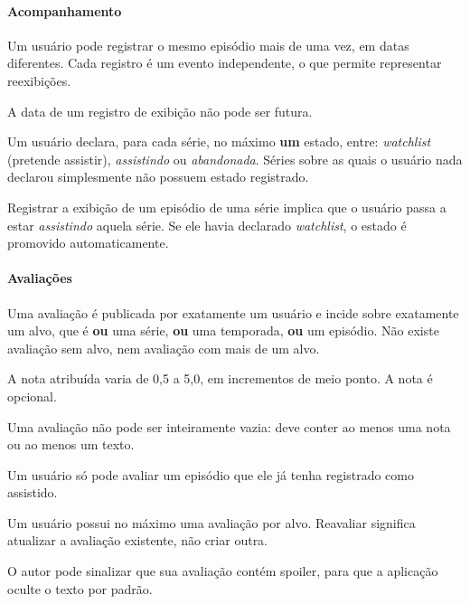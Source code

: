 \documentclass[a4paper,12pt,oneside,openany]{book}
\begin{document}
\paragraph{Acompanhamento}
\begin{description}[leftmargin=2.2cm,style=nextline,font=\normalfont\bfseries]
    \item[RN11] Um usuário pode registrar o mesmo episódio mais de uma vez, em
    datas diferentes. Cada registro é um evento independente, o que permite
    representar reexibições.
    \item[RN12] A data de um registro de exibição não pode ser futura.
    \item[RN13] Um usuário declara, para cada série, no máximo \textbf{um} estado,
    entre: \textit{watchlist} (pretende assistir), \textit{assistindo} ou
    \textit{abandonada}. Séries sobre as quais o usuário nada declarou simplesmente
    não possuem estado registrado.
    \item[RN14] Registrar a exibição de um episódio de uma série implica que o
    usuário passa a estar \textit{assistindo} aquela série. Se ele havia declarado
    \textit{watchlist}, o estado é promovido automaticamente.
\end{description}

\paragraph{Avaliações}
\begin{description}[leftmargin=2.2cm,style=nextline,font=\normalfont\bfseries]
    \item[RN15] Uma avaliação é publicada por exatamente um usuário e incide sobre
    exatamente um alvo, que é \textbf{ou} uma série, \textbf{ou} uma temporada,
    \textbf{ou} um episódio. Não existe avaliação sem alvo, nem avaliação com mais
    de um alvo.
    \item[RN16] A nota atribuída varia de 0,5 a 5,0, em incrementos de meio ponto.
    A nota é opcional.
    \item[RN17] Uma avaliação não pode ser inteiramente vazia: deve conter ao
    menos uma nota ou ao menos um texto.
    \item[RN18] Um usuário só pode avaliar um episódio que ele já tenha registrado
    como assistido.
    \item[RN19] Um usuário possui no máximo uma avaliação por alvo. Reavaliar
    significa atualizar a avaliação existente, não criar outra.
    \item[RN20] O autor pode sinalizar que sua avaliação contém spoiler, para que a
    aplicação oculte o texto por padrão.
\end{description}
\end{document}
